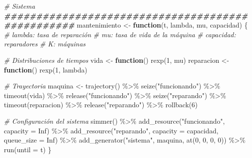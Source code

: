 \documentclass[
]{book}
\newenvironment{Shaded}{\begin{snugshade}}{\end{snugshade}}
\newcommand{\AttributeTok}[1]{\textcolor[rgb]{0.77,0.63,0.00}{#1}}
\newcommand{\CommentTok}[1]{\textcolor[rgb]{0.56,0.35,0.01}{\textit{#1}}}
\newcommand{\ConstantTok}[1]{\textcolor[rgb]{0.00,0.00,0.00}{#1}}
\newcommand{\ControlFlowTok}[1]{\textcolor[rgb]{0.13,0.29,0.53}{\textbf{#1}}}
\newcommand{\DecValTok}[1]{\textcolor[rgb]{0.00,0.00,0.81}{#1}}
\newcommand{\DocumentationTok}[1]{\textcolor[rgb]{0.56,0.35,0.01}{\textbf{\textit{#1}}}}
\newcommand{\FunctionTok}[1]{\textcolor[rgb]{0.00,0.00,0.00}{#1}}
\newcommand{\NormalTok}[1]{#1}
\newcommand{\OtherTok}[1]{\textcolor[rgb]{0.56,0.35,0.01}{#1}}
\newcommand{\SpecialCharTok}[1]{\textcolor[rgb]{0.00,0.00,0.00}{#1}}
\newcommand{\StringTok}[1]{\textcolor[rgb]{0.31,0.60,0.02}{#1}}
\theoremstyle{definition}
\theoremstyle{definition}
\theoremstyle{definition}
\theoremstyle{definition}
\theoremstyle{remark}
\begin{document}
\begin{Shaded}
\begin{Highlighting}[]
\CommentTok{\# Sistema}
\DocumentationTok{\#\#\#\#\#\#\#\#\#\#\#\#\#\#\#\#\#\#\#\#\#\#\#\#\#\#\#\#\#\#\#\#\#\#\#\#\#\#\#\#\#\#\#\#\#\#\#\#\#}
\NormalTok{mantenimiento }\OtherTok{\textless{}{-}} \ControlFlowTok{function}\NormalTok{(t, lambda, mu, capacidad)}
\NormalTok{\{}
  \CommentTok{\# lambda: tasa de reparación}
  \CommentTok{\# mu: tasa de vida de la máquina}
  \CommentTok{\# capacidad: reparadores}
  \CommentTok{\# K: máquinas}
  
  \CommentTok{\# Distribuciones de tiempos}
\NormalTok{  vida }\OtherTok{\textless{}{-}} \ControlFlowTok{function}\NormalTok{() }\FunctionTok{rexp}\NormalTok{(}\DecValTok{1}\NormalTok{, mu)}
\NormalTok{  reparacion }\OtherTok{\textless{}{-}} \ControlFlowTok{function}\NormalTok{() }\FunctionTok{rexp}\NormalTok{(}\DecValTok{1}\NormalTok{, lambda)}
  
  \CommentTok{\# Trayectoria }
\NormalTok{  maquina }\OtherTok{\textless{}{-}} \FunctionTok{trajectory}\NormalTok{() }\SpecialCharTok{\%\textgreater{}\%}
    \FunctionTok{seize}\NormalTok{(}\StringTok{"funcionando"}\NormalTok{) }\SpecialCharTok{\%\textgreater{}\%}
    \FunctionTok{timeout}\NormalTok{(vida) }\SpecialCharTok{\%\textgreater{}\%}
    \FunctionTok{release}\NormalTok{(}\StringTok{"funcionando"}\NormalTok{) }\SpecialCharTok{\%\textgreater{}\%}
    \FunctionTok{seize}\NormalTok{(}\StringTok{"reparando"}\NormalTok{) }\SpecialCharTok{\%\textgreater{}\%}
    \FunctionTok{timeout}\NormalTok{(reparacion) }\SpecialCharTok{\%\textgreater{}\%}
    \FunctionTok{release}\NormalTok{(}\StringTok{"reparando"}\NormalTok{) }\SpecialCharTok{\%\textgreater{}\%}    
    \FunctionTok{rollback}\NormalTok{(}\DecValTok{6}\NormalTok{)}

  \CommentTok{\# Configuración del sistema }
  \FunctionTok{simmer}\NormalTok{() }\SpecialCharTok{\%\textgreater{}\%}
    \FunctionTok{add\_resource}\NormalTok{(}\StringTok{"funcionando"}\NormalTok{, }\AttributeTok{capacity =} \ConstantTok{Inf}\NormalTok{) }\SpecialCharTok{\%\textgreater{}\%}
    \FunctionTok{add\_resource}\NormalTok{(}\StringTok{"reparando"}\NormalTok{, }\AttributeTok{capacity =}\NormalTok{ capacidad, }\AttributeTok{queue\_size =} \ConstantTok{Inf}\NormalTok{) }\SpecialCharTok{\%\textgreater{}\%}
    \FunctionTok{add\_generator}\NormalTok{(}\StringTok{"sistema"}\NormalTok{, maquina, }\FunctionTok{at}\NormalTok{(}\DecValTok{0}\NormalTok{, }\DecValTok{0}\NormalTok{, }\DecValTok{0}\NormalTok{, }\DecValTok{0}\NormalTok{)) }\SpecialCharTok{\%\textgreater{}\%}
    \FunctionTok{run}\NormalTok{(}\AttributeTok{until =}\NormalTok{ t)     }
\NormalTok{\}}
\end{Highlighting}
\end{Shaded}
\end{document}
